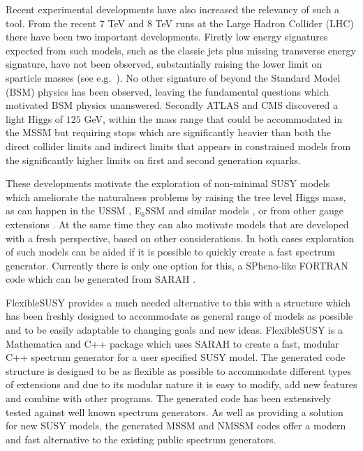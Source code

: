 \documentclass[final,3p,11pt,pdflatex]{elsarticle}
\makeatletter
\newcommand{\sarah}{SARAH\@\xspace}
\newcommand{\fs}{FlexibleSUSY\@\xspace}
\newcommand{\mathematica}{Mathematica\xspace}
\newcommand{\ESSM}{E$_6$SSM\@\xspace}
\makeatother
\begin{document}
Recent experimental developments have also increased the relevancy of
such a tool. From the recent $7$ TeV and $8$ TeV runs at the Large
Hadron Collider (LHC) there have been two important developments.
Firstly low energy signatures expected from such models, such as the
classic jets plus missing transverse energy signature, have not been
observed, substantially raising the lower limit on sparticle masses
(see e.g.~\cite{Aad:2013wta,Chatrchyan:2014lfa}). No other signature
of beyond the Standard Model (BSM) physics has been observed, leaving
the fundamental questions which motivated BSM physics
unanswered. Secondly ATLAS and CMS discovered \cite{ATLAS:2012ae,
  Chatrchyan:2012tx} a light Higgs of $125$ GeV, within the mass range
that could be accommodated in the MSSM but requiring stops which are
significantly heavier than both the direct collider limits and
indirect limits that appears in constrained models from the
significantly higher limits on first and second generation squarks.

These developments motivate the exploration of non-minimal SUSY models
which ameliorate the naturalness problems by raising the tree level
Higgs mass, as can happen in the USSM
\cite{Fayet:1977yc,Cvetic:1997ky,Langacker:2008yv}, \ESSM
\cite{King:2005jy,Athron:2010zz} and similar models
\cite{Nevzorov:2012hs}, or from other gauge extensions
\cite{Batra:2003nj, Bharucha:2013ela}. At the same time they can also
motivate models that are developed with a fresh perspective, based on
other considerations.  In both cases exploration of such models can be
aided if it is possible to quickly create a fast spectrum generator.
Currently there is only one option for this, a SPheno-like FORTRAN
code which can be generated from \sarah
\cite{Staub:2010ty,Staub:2009bi,Staub:2010jh,Staub:2012pb,Staub:2013tta}.

\fs provides a much needed alternative to this with a structure which
has been freshly designed to accommodate as general range of models as
possible and to be easily adaptable to changing goals and new
ideas. \fs is a \mathematica and C++ package which uses \sarah to create a
fast, modular C++ spectrum generator for a user specified SUSY model.
The generated code structure is designed to be as flexible as possible
to accommodate different types of extensions and due to its modular
nature it is easy to modify, add new features and combine with other
programs.  The generated code has been extensively tested against well
known spectrum generators. As well as providing a solution for new
SUSY models, the generated MSSM and NMSSM codes offer a modern and fast
alternative to the existing public spectrum generators.
\end{document}
